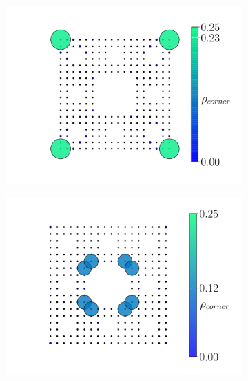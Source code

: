 \begin{figure}[h!]
\begin{subfigure}[b!]{0.2 \textwidth}
     \end{subfigure}\hspace*{-0.5em} 
      \begin{subfigure}[b!]{0.3 \textwidth}
         \caption{}
         \includegraphics[width=\textwidth]{Imagenes/Resultados_Hoti_Fractal/proyection_square.pdf}
     \end{subfigure}\hspace*{-0.5em} 
     \begin{subfigure}[b!]{0.3 \textwidth}
        \caption{}
        \includegraphics[width=\textwidth]{Imagenes/Resultados_Hoti_Fractal/proyection_square_other.pdf}
    \end{subfigure}\hspace*{-0.5em} \vspace*{-0.5em}

\end{figure}
